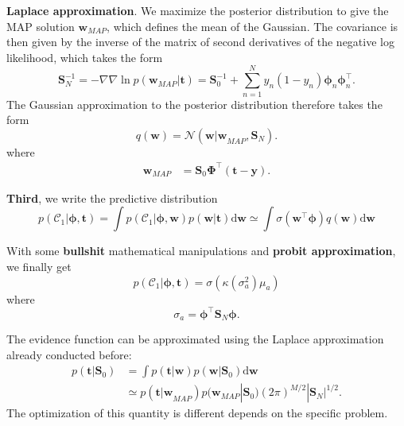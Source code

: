 \documentclass[a4paper]{book}
\newcommand{\ud}{\mathrm{d}}
\renewcommand{\bf}{\mathbf}
\renewcommand{\cal}{\mathcal}
\newcommand{\bs}{\boldsymbol}
\begin{document}
\textbf{Laplace approximation}. We maximize the posterior distribution to give the MAP solution $\bf{w}_{MAP}$, which defines the mean of the Gaussian. The covariance is then given by the inverse of the matrix of second derivatives of the negative log likelihood, which takes the form
\begin{equation}
	\bf{S}_N^{-1} = - \nabla\nabla \ln p(\bf{w}_{MAP}|\bf{t}) = \bf{S}_0^{-1} + \sum_{n=1}^N y_n(1-y_n)\bs{\phi}_n \bs{\phi}_n^{\intercal}.
\end{equation}
The Gaussian approximation to the posterior distribution therefore takes the form
\begin{equation}
	q(\bf{w}) = \cal{N}(\bf{w|w}_{MAP},\bf{S}_N).
\end{equation}
where
\begin{align}
	\bf{w}_{MAP} &=  \bf{S}_0 \bs{\Phi}^{\intercal} (\bf{t-y}).
\end{align}

\textbf{Third}, we write the predictive distribution
\begin{equation}
	p(\cal{C}_1|\bs{\phi},\bf{t})=\int p(\cal{C}_1|\bs{\phi},\bf{w})p(\bf{w|t}) \ud \bf{w} \simeq \int \sigma(\bf{w}^{\intercal}\bs{\phi})q(\bf{w})\ud \bf{w}
\end{equation}

With some \textbf{bullshit} mathematical manipulations and \textbf{probit approximation}, we finally get
\begin{equation}
	p(\cal{C}_1|\bs{\phi},\bf{t}) = \sigma(\kappa(\sigma_a^2)\mu_a)
\end{equation}
where
\begin{equation}
	\sigma_a = \bs{\phi}^{\intercal} \bf{S}_N \bs{\phi}.
\end{equation}

The evidence function can be approximated using the Laplace approximation already conducted before:
\begin{align}
	p(\bf{t}|\bf{S}_0) &= \int p(\bf{t|w})p(\bf{w}|\bf{S}_0) \ud \bf{w} \\
	&\simeq p(\bf{t|w}_{MAP})p(\bf{w}_{MAP}|\bf{S}_0)(2\pi)^{M/2}|\bf{S}_N|^{1/2}. \label{LCEvi}
\end{align}
The optimization of this quantity is different depends on the specific problem.
\end{document}
